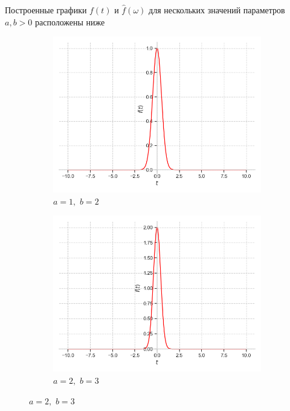 \documentclass[a4paper, 16pt]{article}
\begin{document}
    \noindent Построенные графики $f(t)$ и $\hat{f}\left(\omega\right)$ для нескольких значений параметров $a,b>0$ расположены ниже
    \begin{figure}[htbp]
        \centering
        \begin{subfigure}{0.3\textwidth}
            \centering
            \includegraphics[width=\linewidth]{gaus_a=1_b=2.png}
            \caption{$a=1,\,\,b=2$}
            \label{fig:gaus_1}
        \end{subfigure}
        \hfill
        \begin{subfigure}{0.3\textwidth}
            \centering
            \includegraphics[width=\linewidth]{gaus_a=2_b=3.png}
            \caption{$a=2,\,\,b=3$}

\end{subfigure}
\end{figure}
\end{document}
